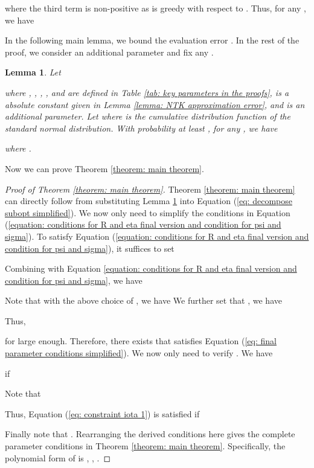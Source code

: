 \documentclass{article} \usepackage{iclr2023/iclr2023_conference,times}
\newtheorem{lemma}{Lemma}[section]
\begin{document}
where the third term is non-positive as  is greedy with respect to . Thus, for any , we have 


In the following main lemma, we bound the evaluation error . In the rest of the proof, we consider an additional parameter  and fix any . 
\begin{lemma}
Let 

where , , , , and  are defined in Table \ref{tab: key parameters in the proofs},  is a absolute constant given in Lemma \ref{lemma: NTK approximation error}, and  is an additional parameter.
Let  where  is the cumulative distribution function of the standard normal distribution. With probability at least , for any , we have 

where . 
\label{lemma: bound of the evalulation error - main lemma}
\end{lemma}


Now we can prove Theorem \ref{theorem: main theorem}. 
\begin{proof}[Proof of Theorem \ref{theorem: main theorem}]
Theorem \ref{theorem: main theorem} can directly follow from substituting Lemma \ref{lemma: bound of the evalulation error - main lemma} into Equation (\ref{eq: decompose subopt simplified}). We now only need to simplify the conditions in Equation (\ref{equation: conditions for R and eta final version and condition for psi and sigma}). To satisfy Equation (\ref{equation: conditions for R and eta final version and condition for psi and sigma}), it suffices to set


Combining with Equation \ref{equation: conditions for R and eta final version and condition for psi and sigma}, we have


Note that with the above choice of , we have 
We further set that , we have

Thus, 

for  large enough. Therefore, there exists  that satisfies Equation (\ref{eq: final parameter conditions simplified}). We now only need to verify . We have 


if 

Note that 

Thus, Equation (\ref{eq: constraint iota 1}) is satisfied if 

Finally note that . Rearranging the derived conditions here gives the complete parameter conditions in Theorem \ref{theorem: main theorem}. Specifically, the polynomial form of  is 
, , .







\end{proof}
\end{document}
